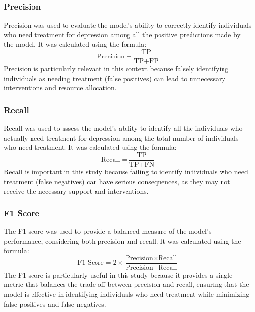 \documentclass[conference]{IEEEtran}
\begin{document}
\subsubsection{Precision}
Precision was used to evaluate the model's ability to correctly identify individuals who need treatment for depression among all the positive predictions made by the model. It was calculated using the formula:
\begin{equation}
\text{Precision} = \frac{\text{TP}}{\text{TP} + \text{FP}}
\end{equation}
Precision is particularly relevant in this context because falsely identifying individuals as needing treatment (false positives) can lead to unnecessary interventions and resource allocation.

\subsubsection{Recall}
Recall was used to assess the model's ability to identify all the individuals who actually need treatment for depression among the total number of individuals who need treatment. It was calculated using the formula:
\begin{equation}
\text{Recall} = \frac{\text{TP}}{\text{TP} + \text{FN}}
\end{equation}
Recall is important in this study because failing to identify individuals who need treatment (false negatives) can have serious consequences, as they may not receive the necessary support and interventions.

\subsubsection{F1 Score}
The F1 score was used to provide a balanced measure of the model's performance, considering both precision and recall. It was calculated using the formula:
\begin{equation}
\text{F1 Score} = 2 \times \frac{\text{Precision} \times \text{Recall}}{\text{Precision} + \text{Recall}}
\end{equation}
The F1 score is particularly useful in this study because it provides a single metric that balances the trade-off between precision and recall, ensuring that the model is effective in identifying individuals who need treatment while minimizing false positives and false negatives.
\end{document}

